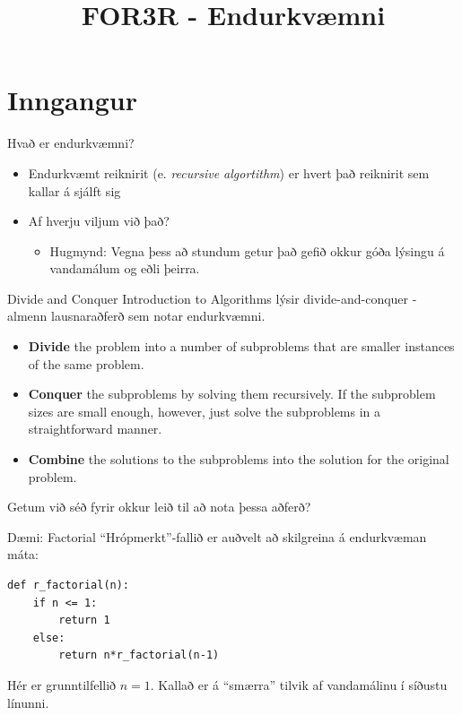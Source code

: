 \documentclass[handout]{beamer}
\title{FOR3R - Endurkvæmni}
\begin{document}
\begin{frame}
\titlepage
\end{frame}

\section{Inngangur}

\begin{frame}{Hvað er endurkvæmni?}
\pause
\begin{itemize}
 \item Endurkvæmt reiknirit (e. \emph{recursive algortithm}) er hvert það reiknirit sem kallar á sjálft sig \pause
 \item Af hverju viljum við það? \pause
 \begin{itemize}
  \item Hugmynd: Vegna þess að stundum getur það gefið okkur góða lýsingu á vandamálum og eðli þeirra.
 \end{itemize}
\end{itemize}
\end{frame}

\begin{frame}{Divide and Conquer}
Introduction to Algorithms lýsir divide-and-conquer - almenn lausnaraðferð sem notar endurkvæmni.
\begin{itemize}
 \item  \textbf{Divide} the problem into a number of subproblems that are smaller instances of the
same problem.
 \item \textbf{Conquer} the subproblems by solving them recursively. If the subproblem sizes are
small enough, however, just solve the subproblems in a straightforward manner.
 \item \textbf{Combine} the solutions to the subproblems into the solution for the original problem.
\end{itemize}
Getum við séð fyrir okkur leið til að nota þessa aðferð?
\end{frame}


\begin{frame}[fragile]{Dæmi: Factorial}
``Hrópmerkt''-fallið er auðvelt að skilgreina á endurkvæman máta:

\begin{verbatim}
def r_factorial(n):
    if n <= 1:
        return 1
    else:
        return n*r_factorial(n-1)
\end{verbatim}
Hér er grunntilfellið $n=1$. Kallað er á ``smærra'' tilvik af vandamálinu í síðustu línunni. 
\end{frame}
\end{document}

